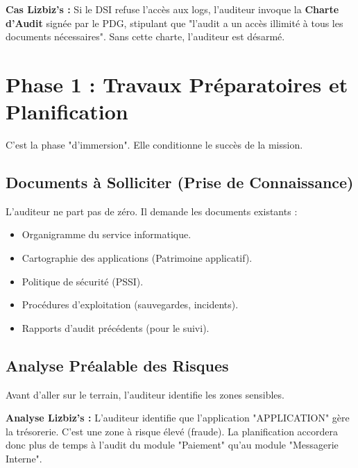 \begin{boxlizbiz}
\textbf{Cas Lizbiz's :}
Si le DSI refuse l'accès aux logs, l'auditeur invoque la \textbf{Charte d'Audit} signée par le PDG, stipulant que "l'audit a un accès illimité à tous les documents nécessaires". Sans cette charte, l'auditeur est désarmé.
\end{boxlizbiz}

\section{Phase 1 : Travaux Préparatoires et Planification}

C'est la phase "d'immersion". Elle conditionne le succès de la mission.

\subsection{Documents à Solliciter (Prise de Connaissance)}

L'auditeur ne part pas de zéro. Il demande les documents existants :
\begin{itemize}
    \item Organigramme du service informatique.
    \item Cartographie des applications (Patrimoine applicatif).
    \item Politique de sécurité (PSSI).
    \item Procédures d'exploitation (sauvegardes, incidents).
    \item Rapports d'audit précédents (pour le suivi).
\end{itemize}

\subsection{Analyse Préalable des Risques}

Avant d'aller sur le terrain, l'auditeur identifie les zones sensibles.
\begin{boxlizbiz}
\textbf{Analyse Lizbiz's :}
L'auditeur identifie que l'application "APPLICATION" gère la trésorerie. C'est une zone à risque élevé (fraude). La planification accordera donc plus de temps à l'audit du module "Paiement" qu'au module "Messagerie Interne".
\end{boxlizbiz}

